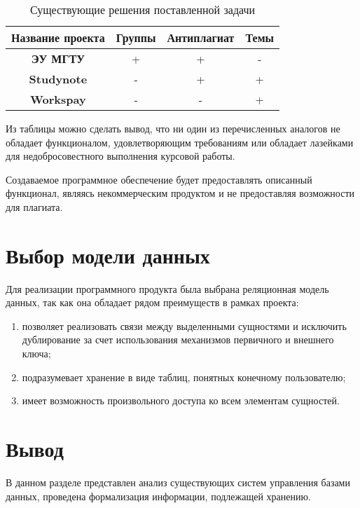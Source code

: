 \begin{table}[ht!]
	\centering
	\caption{Существующие решения поставленной задачи}
	\label{tbl:anal}
	\begin{tabular}{|c|c|c|c|}
		\hline
		\textbf{Название проекта} & \textbf{Группы} & \textbf{Антиплагиат} & \textbf{Темы}\\
		\hline
		
		\textbf{ЭУ МГТУ}\cite{eu} & + 
		& +
		& -\\
		\hline
		
		\textbf{Studynote} \cite{studynote} & - 
		& +
		& +\\
		\hline
		
		\textbf{Workspay \cite{workspay}} & -
		& -
		& +\\
		\hline
	\end{tabular}
\end{table}

Из таблицы можно сделать вывод, что ни один из перечисленных аналогов не обладает функционалом, удовлетворяющим требованиям или обладает лазейками для недобросовестного выполнения курсовой работы.

Создаваемое программное обеспечение будет предоставлять описанный функционал, являясь некоммерческим продуктом и не предоставляя возможности для плагиата.

\section{Выбор модели данных}

Для реализации программного продукта была выбрана реляционная модель данных, так как она обладает рядом преимуществ в рамках проекта:

\begin{enumerate}
	\item позволяет реализовать связи между выделенными сущностями и исключить дублирование за счет использования механизмов первичного и внешнего ключа;
	\item подразумевает хранение в виде таблиц, понятных конечному пользователю;
	\item имеет возможность произвольного доступа ко всем элементам сущностей.
\end{enumerate}

\section{Вывод}
В данном разделе представлен анализ существующих систем управления базами данных, проведена формализация информации, подлежащей хранению.